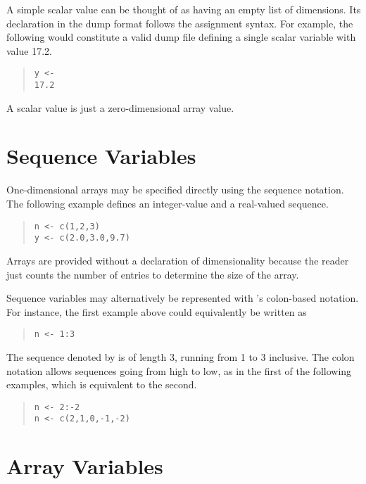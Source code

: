 A simple scalar value can be thought of as having an empty list of
dimensions.  Its declaration in the dump format follows the \SPLUS
assignment syntax.  For example, the following would constitute a
valid dump file defining a single scalar variable  with value
17.2.
%
\begin{quote}
\begin{Verbatim}
y <- 
17.2
\end{Verbatim}
\end{quote}
%
A scalar value is just a zero-dimensional array value.


\section{Sequence Variables}

One-dimensional arrays may be specified directly using the \SPLUS
sequence notation.  The following example defines an integer-value and
a real-valued sequence.
%
\begin{quote}
\begin{Verbatim}
n <- c(1,2,3)
y <- c(2.0,3.0,9.7)
\end{Verbatim}
\end{quote}
%
Arrays are provided without a declaration of dimensionality because
the reader just counts the number of entries to determine the size of
the array.

Sequence variables may alternatively be represented with \R's
colon-based notation.  For instance, the first example above could
equivalently be written as
%
\begin{quote}
\begin{Verbatim} 
n <- 1:3
\end{Verbatim}
\end{quote}
% 
The sequence denoted by  is of length 3, running from 1 to 3
inclusive.  The colon notation allows sequences going from high to
low, as in the first of the following examples, which is equivalent to
the second.
%
\begin{quote}
\begin{Verbatim}
n <- 2:-2
n <- c(2,1,0,-1,-2)
\end{Verbatim}
\end{quote}
%


\section{Array Variables}

